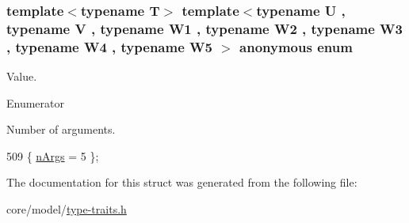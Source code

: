 \subsubsection[{\texorpdfstring{anonymous enum}{anonymous enum}}]{\setlength{\rightskip}{0pt plus 5cm}template$<$typename T$>$ template$<$typename U , typename V , typename W1 , typename W2 , typename W3 , typename W4 , typename W5 $>$ anonymous enum}\hypertarget{structTypeTraits_1_1PtrToMemberTraits_3_01U_07V_1_1_5_08_07W1_00_01W2_00_01W3_00_01W4_00_01W5_08_01const_01_01_4_a2aeb341dc046c29bbf9d1707b050a0ad}{}\label{structTypeTraits_1_1PtrToMemberTraits_3_01U_07V_1_1_5_08_07W1_00_01W2_00_01W3_00_01W4_00_01W5_08_01const_01_01_4_a2aeb341dc046c29bbf9d1707b050a0ad}
Value. \begin{Desc}
\item[Enumerator]\par
\begin{description}
\item[{\em 
n\+Args\hypertarget{structTypeTraits_1_1PtrToMemberTraits_3_01U_07V_1_1_5_08_07W1_00_01W2_00_01W3_00_01W4_00_01W5_08_01const_01_01_4_a2aeb341dc046c29bbf9d1707b050a0ada90166c7045bdd19eacc875e6237710fd}{}\label{structTypeTraits_1_1PtrToMemberTraits_3_01U_07V_1_1_5_08_07W1_00_01W2_00_01W3_00_01W4_00_01W5_08_01const_01_01_4_a2aeb341dc046c29bbf9d1707b050a0ada90166c7045bdd19eacc875e6237710fd}
}]Number of arguments. \end{description}
\end{Desc}

\begin{DoxyCode}
509 \{ \hyperlink{structTypeTraits_1_1PtrToMemberTraits_3_01U_07V_1_1_5_08_07W1_00_01W2_00_01W3_00_01W4_00_01W5_08_01const_01_01_4_a2aeb341dc046c29bbf9d1707b050a0ada90166c7045bdd19eacc875e6237710fd}{nArgs} = 5                \};
\end{DoxyCode}


The documentation for this struct was generated from the following file\+:\begin{DoxyCompactItemize}
\item 
core/model/\hyperlink{type-traits_8h}{type-\/traits.\+h}\end{DoxyCompactItemize}
